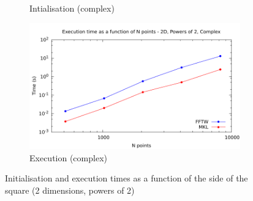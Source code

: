 \documentclass[12pt, a4paper]{article}
\begin{document}
\begin{figure}[H]
\begin{subfigure}{.5\textwidth}
\caption{Intialisation (complex)}
\label{2DPOW2CI}
\end{subfigure}%
\begin{subfigure}{.5\textwidth}
\centering
\includegraphics[width=.9\linewidth]{graphs/2d-pow2-exec-c.pdf}
\caption{Execution (complex)}
\label{2DPOW2C}
\end{subfigure}
\caption{Initialisation and execution times as a function of the side of the square (2 dimensions, powers of 2)}
\label{2DPOW2}
\end{figure}
\end{document}
